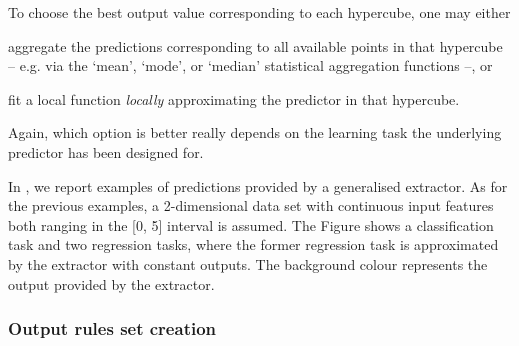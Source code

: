 \documentclass[
]{ceurart}
\begin{document}
To choose the best output value corresponding to each hypercube, one may either 
%
\begin{inlinelist}
	\item aggregate the predictions corresponding to all available points in that hypercube -- e.g. via the `mean', `mode', or `median' statistical aggregation functions --, or
	\item fit a local function \emph{locally} approximating the predictor in that hypercube.
\end{inlinelist}
%
Again, which option is better really depends on the learning task the underlying predictor has been designed for.
%




In , we report examples of predictions provided by a generalised extractor.
%
As for the previous examples, a 2-dimensional data set with continuous input features both ranging in the [0, 5] interval is assumed.
%
The Figure shows a classification task and two regression tasks, where the former regression task is approximated by the extractor with constant outputs.
%
The background colour represents the output provided by the extractor.

\subsubsection{Output rules set creation}\label{ssec:rule}
\end{document}
